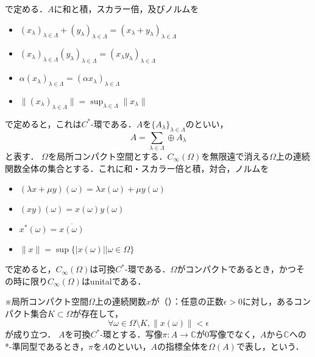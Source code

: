 で定める．$A$に和と積，スカラー倍，及びノルムを
\begin{itemize}
\item $\left( x_{\lambda}\right)_{\lambda \in \Lambda}+\left( y_{\lambda}\right)_{\lambda \in \Lambda}
=\left( x_{\lambda}+y_{\lambda}\right)_{\lambda \in \Lambda}$
\item $\left( x_{\lambda}\right)_{\lambda \in \Lambda}\left( y_{\lambda}\right)_{\lambda \in \Lambda}
=\left( x_{\lambda}y_{\lambda}\right)_{\lambda \in \Lambda}$
\item $\alpha \left( x_{\lambda}\right)_{\lambda \in \Lambda}=\left( \alpha x_{\lambda}\right)_{\lambda \in \Lambda}$
\item $\lVert \left( x_{\lambda}\right)_{\lambda \in \Lambda}\rVert=\sup_{\lambda \in \Lambda}\lVert x_{\lambda}\rVert$
\end{itemize}
で定めると，これは$C^*$-環である．$A$を$\{A_{\lambda}\}_{\lambda \in \Lambda}$のといい，
\[A=\sum_{\lambda \in \Lambda} \oplus A_{\lambda}\] %
と表す．
$\Omega$を局所コンパクト空間とする．$C_{\infty}\left( \Omega\right)$を無限遠で消える$\Omega$上の連続関数全体の集合とする．これに和・スカラー倍と積，対合，ノルムを
\begin{itemize}
\item $\left(\lambda x+\mu y\right)\left(\omega\right)=\lambda x\left(\omega\right)+\mu y\left(\omega\right)$
\item $\left(xy\right)\left(\omega\right)=x\left(\omega\right)y\left(\omega\right)$
\item $x^*\left(\omega\right)=\overline{x\left(\omega\right)}$
\item $\lVert x\rVert=\sup\{|x\left(\omega\right)||\omega \in \Omega\}$
\end{itemize}
で定めると，$C_{\infty}(\Omega)$は可換$C^*$-環である．$\Omega$がコンパクトであるとき，かつその時に限り$C_{\infty}(\Omega)$はunitalである．

※局所コンパクト空間$\Omega$上の連続関数$x$が（）：任意の正数$\epsilon >0$に対し，あるコンパクト集合$K\subset \Omega$が存在して，
\[\forall \omega \in \Omega\setminus K,\lVert x(\omega)\rVert<\epsilon\]
が成り立つ．
$A$を可換$C^*$-環とする．写像$\pi:A\rightarrow\mathbb{C}$が0写像でなく，$A$から$\mathbb{C}$への *-準同型であるとき，$\pi$を$A$のといい，$A$の指標全体を$\Omega\left(A\right)$で表し，という．

